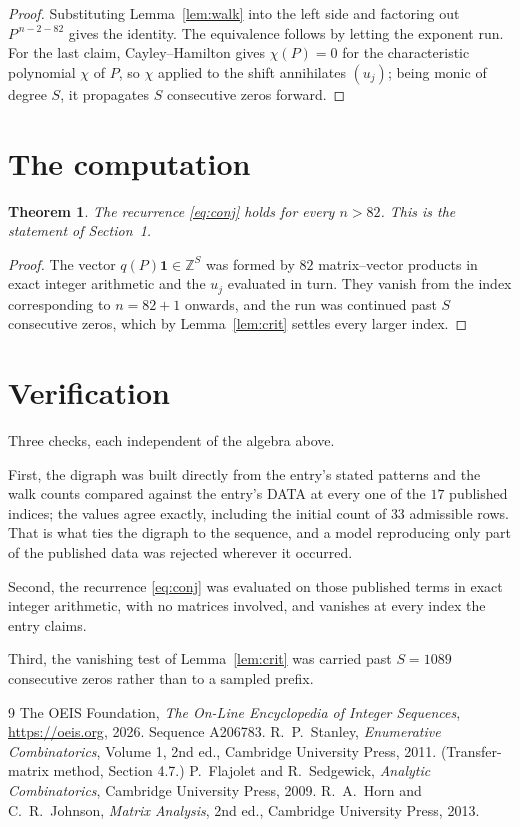 \documentclass[11pt,a4paper]{article}
\theoremstyle{plain}
\newtheorem{theorem}{Theorem}
\theoremstyle{definition}
\begin{document}
\begin{proof}
Substituting Lemma~\ref{lem:walk} into the left side and factoring out
$P^{\,n-2-82}$ gives the identity. The equivalence follows by letting the exponent
run. For the last claim, Cayley--Hamilton gives $\chi(P)=0$ for the characteristic
polynomial $\chi$ of $P$, so $\chi$ applied to the shift annihilates $(u_j)$; being monic of
degree $S$, it propagates $S$ consecutive zeros forward.
\end{proof}

\section{The computation}

\begin{theorem}
The recurrence \eqref{eq:conj} holds for every $n>82$. This is the statement of
Section~1.
\end{theorem}

\begin{proof}
The vector $q(P)\mathbf{1}\in\mathbb{Z}^{S}$ was formed by $82$ matrix--vector
products in exact integer arithmetic and the $u_j$ evaluated in turn. They vanish from the
index corresponding to $n=82+1$ onwards, and the run was continued past $S$ consecutive
zeros, which by Lemma~\ref{lem:crit} settles every larger index.
\end{proof}

\section{Verification}

Three checks, each independent of the algebra above.

First, the digraph was built directly from the entry's stated patterns and the walk counts
compared against the entry's DATA at every one of the $17$ published indices; the
values agree exactly, including the initial count of $33$ admissible rows. That is
what ties the digraph to the sequence, and a model reproducing only part of the published
data was rejected wherever it occurred.

Second, the recurrence \eqref{eq:conj} was evaluated on those published terms in exact
integer arithmetic, with no matrices involved, and vanishes at every index the entry claims.

Third, the vanishing test of Lemma~\ref{lem:crit} was carried past $S=1089$ consecutive
zeros rather than to a sampled prefix.

\begin{thebibliography}{9}
 The OEIS Foundation, \emph{The On-Line Encyclopedia of Integer
Sequences}, \url{https://oeis.org}, 2026. Sequence A206783.
 R.~P.~Stanley, \emph{Enumerative Combinatorics}, Volume 1, 2nd ed.,
Cambridge University Press, 2011. (Transfer-matrix method, Section 4.7.)
 P.~Flajolet and R.~Sedgewick, \emph{Analytic Combinatorics}, Cambridge
University Press, 2009.
 R.~A.~Horn and C.~R.~Johnson, \emph{Matrix Analysis}, 2nd ed., Cambridge
University Press, 2013.
\end{thebibliography}
\end{document}
